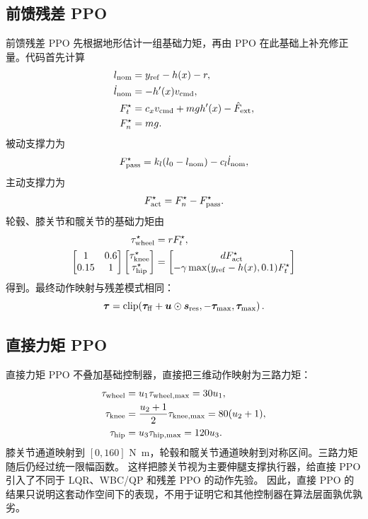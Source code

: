 \documentclass[UTF8,12pt,a4paper,fontset=none]{ctexart}
\begin{document}
\subsection{前馈残差 PPO}
前馈残差 PPO 先根据地形估计一组基础力矩，再由 PPO 在此基础上补充修正量。代码首先计算
\begin{align}
l_{\rm nom}&=y_{\rm ref}-h(x)-r,\\
\dot l_{\rm nom}&=-h'(x)v_{\rm cmd},\\
F_t^\star&=c_xv_{\rm cmd}+mgh'(x)-\hat F_{\rm ext},\\
F_n^\star&=mg.
\end{align}
被动支撑力为
\begin{equation}
F_{\rm pass}^\star=k_l(l_0-l_{\rm nom})-c_l\dot l_{\rm nom},
\end{equation}
主动支撑力为
\begin{equation}
F_{\rm act}^\star=F_n^\star-F_{\rm pass}^\star.
\end{equation}
轮毂、膝关节和髋关节的基础力矩由
\begin{align}
\tau_{\rm wheel}^\star&=rF_t^\star,\\
\begin{bmatrix}
1 & 0.6\\
0.15 & 1
\end{bmatrix}
\begin{bmatrix}
\tau_{\rm knee}^\star\\
\tau_{\rm hip}^\star
\end{bmatrix}
&=
\begin{bmatrix}
dF_{\rm act}^\star\\
-\gamma\max(y_{\rm ref}-h(x),0.1)F_t^\star
\end{bmatrix}
\end{align}
得到。最终动作映射与残差模式相同：
\begin{equation}
\bm\tau=\operatorname{clip}\!\left(\bm\tau_{\rm ff}+\bm u\odot\bm s_{\rm res},
-\bm\tau_{\max},\bm\tau_{\max}\right).
\end{equation}

\subsection{直接力矩 PPO}
直接力矩 PPO 不叠加基础控制器，直接把三维动作映射为三路力矩：
\begin{align}
\tau_{\rm wheel}&=u_1\tau_{{\rm wheel},\max}=30u_1,\\
\tau_{\rm knee}&=\frac{u_2+1}{2}\tau_{{\rm knee},\max}=80(u_2+1),\\
\tau_{\rm hip}&=u_3\tau_{{\rm hip},\max}=120u_3.
\end{align}
膝关节通道映射到 $[0,160]$ \si{N.m}，轮毂和髋关节通道映射到对称区间。三路力矩随后仍经过统一限幅函数。
这样把膝关节视为主要伸腿支撑执行器，给直接 PPO 引入了不同于 LQR、WBC/QP 和残差 PPO 的动作先验。
因此，直接 PPO 的结果只说明这套动作空间下的表现，不用于证明它和其他控制器在算法层面孰优孰劣。
\end{document}
